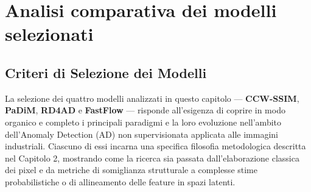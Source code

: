\chapter{Analisi comparativa dei modelli selezionati}

\section{Criteri di Selezione dei Modelli}
La selezione dei quattro modelli analizzati in questo capitolo --- \textbf{CCW-SSIM}, \textbf{PaDiM}, \textbf{RD4AD} e \textbf{FastFlow} --- risponde all'esigenza di coprire in modo organico e completo i principali paradigmi e la loro evoluzione nell'ambito dell'Anomaly Detection (AD) non supervisionata applicata alle immagini industriali. Ciascuno di essi incarna una specifica filosofia metodologica descritta nel Capitolo 2, mostrando come la ricerca sia passata dall'elaborazione classica dei pixel e da metriche di somiglianza strutturale a complesse stime probabilistiche o di allineamento delle feature in spazi latenti.

